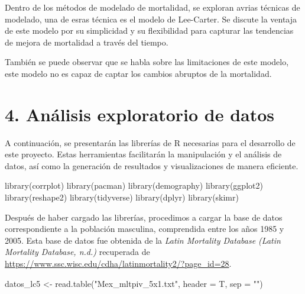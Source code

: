\documentclass[
]{article}
\newenvironment{Shaded}{\begin{snugshade}}{\end{snugshade}}
\newcommand{\AttributeTok}[1]{\textcolor[rgb]{0.77,0.63,0.00}{#1}}
\newcommand{\FunctionTok}[1]{\textcolor[rgb]{0.00,0.00,0.00}{#1}}
\newcommand{\NormalTok}[1]{#1}
\newcommand{\OtherTok}[1]{\textcolor[rgb]{0.56,0.35,0.01}{#1}}
\newcommand{\StringTok}[1]{\textcolor[rgb]{0.31,0.60,0.02}{#1}}
\begin{document}
Dentro de los métodos de modelado de mortalidad, se exploran avrias
técnicas de modelado, una de esras técnica es el modelo de Lee-Carter.
Se discute la ventaja de este modelo por su simplicidad y su
flexibilidad para capturar las tendencias de mejora de mortalidad a
través del tiempo.

También se puede observar que se habla sobre las limitaciones de este
modelo, este modelo no es capaz de captar los cambios abruptos de la
mortalidad.

\hypertarget{anuxe1lisis-exploratorio-de-datos}{%
\section{4. Análisis exploratorio de
datos}\label{anuxe1lisis-exploratorio-de-datos}}

\justifying

A continuación, se presentarán las librerías de R necesarias para el
desarrollo de este proyecto. Estas herramientas facilitarán la
manipulación y el análisis de datos, así como la generación de
resultados y visualizaciones de manera eficiente.

\begin{Shaded}
\begin{Highlighting}[]
\FunctionTok{library}\NormalTok{(corrplot)}
\FunctionTok{library}\NormalTok{(pacman)}
\FunctionTok{library}\NormalTok{(demography)}
\FunctionTok{library}\NormalTok{(ggplot2)}
\FunctionTok{library}\NormalTok{(reshape2)}
\FunctionTok{library}\NormalTok{(tidyverse)}
\FunctionTok{library}\NormalTok{(dplyr)}
\FunctionTok{library}\NormalTok{(skimr)}
\end{Highlighting}
\end{Shaded}

Después de haber cargado las librerías, procedimos a cargar la base de
datos correspondiente a la población masculina, comprendida entre los
años 1985 y 2005. Esta base de datos fue obtenida de la \emph{Latin
Mortality Database (Latin Mortality Database, n.d.)} recuperada de
\url{https://www.ssc.wisc.edu/cdha/latinmortality2/?page_id=28}.

\begin{Shaded}
\begin{Highlighting}[]
\NormalTok{datos\_lc5 }\OtherTok{\textless{}{-}} \FunctionTok{read.table}\NormalTok{(}\StringTok{"Mex\_mltpiv\_5x1.txt"}\NormalTok{, }\AttributeTok{header =}\NormalTok{ T, }\AttributeTok{sep =} \StringTok{""}\NormalTok{) }
\end{Highlighting}
\end{Shaded}
\end{document}
